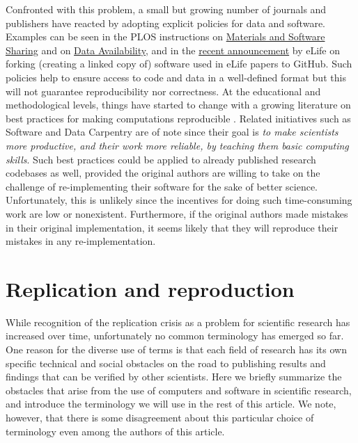 \documentclass[11pt]{article}
\begin{document}
Confronted with this problem, a small but growing number of journals and
publishers have reacted by adopting explicit policies for data and software. Examples can be seen in the PLOS instructions on
\href{http://journals.plos.org/plosone/s/materials-and-software-sharing}{Materials
  and Software Sharing} and
on \href{http://journals.plos.org/plosone/s/data-availability}{Data Availability},
and in the
\href{https://elifesciences.org/elife-news/inside-elife-forking-software-used-elife-papers-github}{recent
  announcement} by eLife on forking (creating a linked copy of) software used in eLife papers to GitHub.
Such policies help to ensure access to code and data in a well-defined format
\citep{perkel:2016} but this will not guarantee reproducibility nor
correctness.
At the educational and methodological levels, things have started to change with a
growing literature on best practices for making computations reproducible
\citep{sandve:2013, crook:2013, wilson:2014, halchenko:2015, janz:2015,
  hinsen:2015}.
  Related initiatives such as Software and Data Carpentry
\citep{wilson:2016} are of note since their goal is {\em to make
scientists more productive, and their work more reliable, by teaching them basic computing skills}.
Such best practices could be applied to already published research codebases as well, provided the original authors are willing to take on the challenge of 
re-implementing their software for the sake of better science.
Unfortunately, this is unlikely since the
incentives for doing such time-consuming work are low or nonexistent.
Furthermore, if the original authors made mistakes in their original
implementation, it seems likely that they will reproduce their mistakes
in any re-implementation.\\


\section*{Replication and reproduction}
\label{sec:replication-reproduction}
While recognition of the replication crisis as a problem
for scientific research has increased over time, unfortunately no 
common terminology has emerged so far. One reason for
the diverse use of terms is that each field of research has its own
specific technical and social obstacles on the road to publishing
results and findings that can be verified by other scientists. Here we
briefly summarize the obstacles that arise from the use of computers
and software in scientific research, and introduce the terminology we
will use in the rest of this article. We note, however, that there is
some disagreement about this particular choice of terminology even
among the authors of this article. \\
\end{document}
